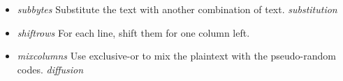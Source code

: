 \documentclass[]{article}
\begin{document}
\begin{itemize}
\begin{itemize}
                    \begin{itemize}
                        \item \textit{subbytes} Substitute the text with another combination of text.
                        \textit{substitution}
                        \item \textit{shiftrows} For each line, shift them for one column left.
                        \item \textit{mixcolumns} Use exclusive-or to mix the plaintext with the pseudo-random codes.
                        \textit{diffusion}
                    \end{itemize}
                    
                \end{itemize}

            \end{itemize}
\end{document}
